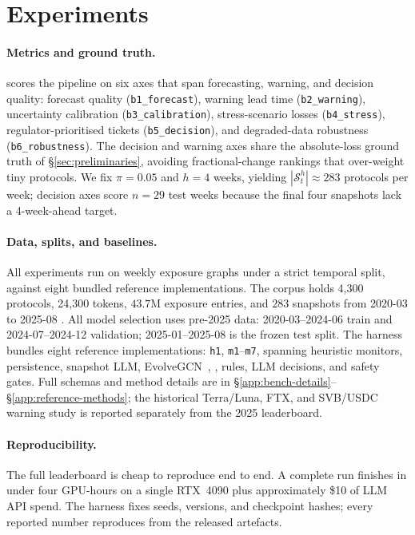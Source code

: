 \section{Experiments}
\label{sec:evaluation}
\label{sec:bench}

\paragraph{Metrics and ground truth.}
\benchname{} scores the pipeline on six axes that span forecasting,
warning, and decision quality: forecast quality
(\texttt{b1\_forecast}), warning lead time (\texttt{b2\_warning}),
uncertainty calibration (\texttt{b3\_calibration}), stress-scenario
losses (\texttt{b4\_stress}), regulator-prioritised tickets
(\texttt{b5\_decision}), and degraded-data robustness
(\texttt{b6\_robustness}). The decision and warning axes share the
absolute-loss ground truth of \S\ref{sec:preliminaries}, avoiding
fractional-change rankings that over-weight tiny protocols. We fix
$\pi\!=\!0.05$ and $h\!=\!4$ weeks, yielding
$|\mathcal{S}_t^h|\!\approx\!283$ protocols per week; decision axes
score $n\!=\!29$ test weeks because the final four snapshots lack a
4-week-ahead target.

\paragraph{Data, splits, and baselines.}
All experiments run on \corpusname{} weekly exposure graphs under a
strict temporal split, against eight bundled reference
implementations. The corpus holds 4{,}300 protocols,
24{,}300 tokens, $43.7$M exposure entries, and $283$ snapshots from
2020-03 to 2025-08 \citep{wu2025dexposuredatasetbenchmarksinterprotocol}.
All model selection uses pre-2025 data: 2020-03--2024-06 train and
2024-07--2024-12 validation; 2025-01--2025-08 is the frozen test
split. The harness bundles eight reference implementations:
\texttt{h1}, \texttt{m1}--\texttt{m7}, spanning heuristic monitors,
persistence, snapshot LLM, EvolveGCN~\citep{ParejaEtAl2020EvolveGCN},
\fmname{}, rules, LLM decisions, and safety gates. Full schemas and
method details are in \S\ref{app:bench-details}--\S\ref{app:reference-methods};
the historical Terra/Luna, FTX, and SVB/USDC warning study is
reported separately from the 2025 leaderboard.

\paragraph{Reproducibility.}
The full leaderboard is cheap to reproduce end to end. A complete
run finishes in under four GPU-hours on a
single RTX~4090 plus approximately \$10 of LLM API spend. The
harness fixes seeds, versions, and checkpoint hashes; every reported
number reproduces from the released artefacts.
